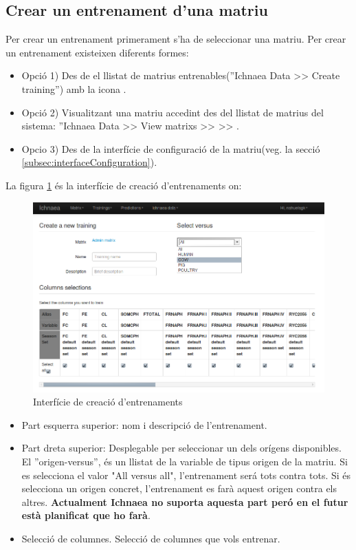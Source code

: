 \subsection{Crear un entrenament d'una matriu}
\label{subsec:createtraining}
Per crear un entrenament primerament s'ha de seleccionar una matriu. Per crear un entrenament existeixen diferents formes:
\begin{itemize} 
\item Opció 1) Des de el llistat de matrius entrenables(''Ichnaea Data >> Create training'') amb la icona \icontraining.
\item Opció 2) Visualitzant una matriu accedint des del llistat de matrius del sistema: ''Ichnaea Data >> View matrixs >> \iconeyeopen >> \icontraining.
\item Opcio 3) Des de la interfície de configuració de la matriu(veg. la secció \ref{subsec:interfaceConfiguration}).
\end{itemize}

La figura \ref{fig:createTraining} \'{e}s la interfície de creació d'entrenaments on:
\begin{figure}[h!]
  \centering
  \includegraphics[scale=0.4]{img/userguide/training_create.png}
  \caption{Interfície de creació d'entrenaments}
  \label{fig:createTraining}
\end{figure}
\begin{itemize}
\item Part esquerra superior: nom i descripci\'{o} de l'entrenament.
\item Part dreta superior: Desplegable per seleccionar un dels orígens disponibles.  El ''origen-versus'', \'{e}s un llistat de la variable de tipus origen de la matriu. Si es selecciona el valor "All versus all", l'entrenament ser\'{a} tots contra tots. Si \'{e}s selecciona un origen concret, l'entrenament es far\`{a} aquest origen contra els altres. \textbf{Actualment Ichnaea no suporta aquesta part per\'{o} en el futur est\`{a} planificat que ho far\`{a}}.
\item Selecci\'{o} de columnes. Selecci\'{o} de columnes que vols entrenar.
\end{itemize}

